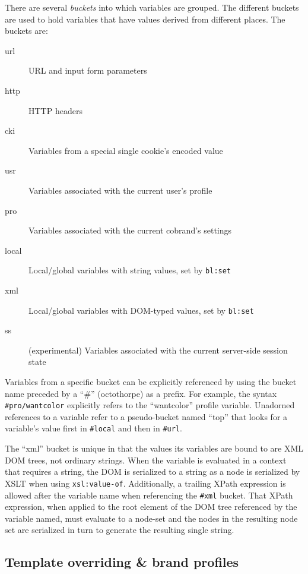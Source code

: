 \documentclass{www2003-submission}
\newcommand{\smtexttt}[1]{{\small\texttt{#1}}}
\begin{document}
There are several \emph{buckets} into which variables are grouped.  The
different buckets are used to hold variables that have values derived
from different places.  The buckets are:

\begin{description}
\item[url] URL and input form parameters
\item[http] HTTP headers
\item[cki] Variables from a special single cookie's encoded value
\item[usr] Variables associated with the current user's profile
\item[pro] Variables associated with the current cobrand's settings
\item[local] Local/global variables with string values, set by \smtexttt{bl:set}
\item[xml] Local/global variables with DOM-typed values, set by \smtexttt{bl:set}
\item[ss] (experimental) Variables associated with the current server-side session
      state
\end{description}

\noindent Variables from a specific bucket can be explicitly referenced
by using the bucket name preceded by a ``\#'' (octothorpe) as a prefix.
For example, the syntax \smtexttt{\#pro/wantcolor} explicitly refers to
the ``wantcolor'' profile variable. Unadorned references to a variable
refer to a pseudo-bucket named ``top'' that looks for a variable's
value first in \smtexttt{\#local} and then in \smtexttt{\#url}.

The ``xml'' bucket is unique in that the values its variables are bound
to are XML DOM trees, not ordinary strings.  When the variable is
evaluated in a context that requires a string, the DOM is serialized to
a string as a node is serialized by XSLT when using
\smtexttt{xsl:value-of}.  Additionally, a trailing XPath expression is
allowed after the variable name when referencing the \smtexttt{\#xml}
bucket.  That XPath expression, when applied to the root element of the
DOM tree referenced by the variable named, must evaluate to a node-set
and the nodes in the resulting node set are serialized in turn to
generate the resulting single string.


\subsection{Template overriding \& brand profiles}
\label{ssec-template-dispatch}
\end{document}
